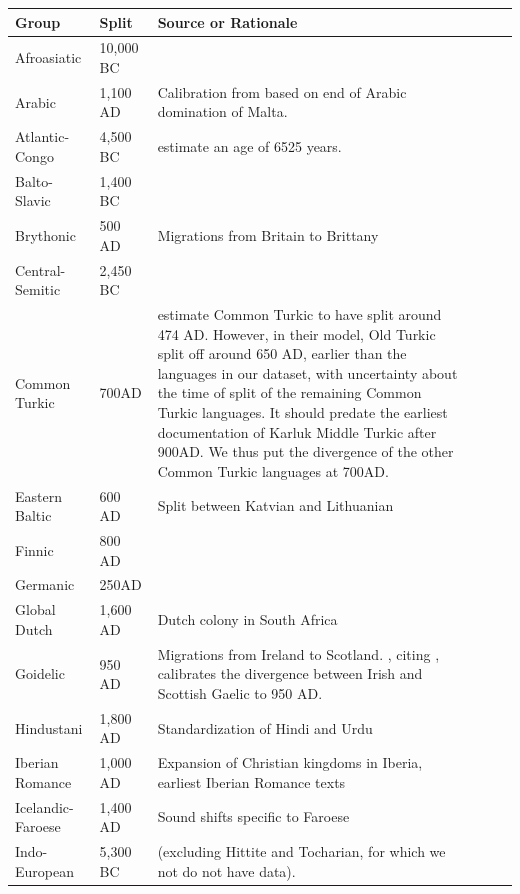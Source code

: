 \documentclass[11pt,a4paper]{article}
\begin{document}
\begin{longtable}{llp{10cm}lll}
Group & Split & Source or Rationale \\ \hline
Afroasiatic & 10,000 BC & \cite{diakonoff1998the} \\
Arabic & 1,100 AD & Calibration from \citep{holman2011automated} based on end of Arabic domination of Malta. \\
Atlantic-Congo & 4,500 BC & \citet{holman2011automated} estimate an age of 6525 years.\\
Balto-Slavic & 1,400 BC & \citep{gray2003language} \\
	Brythonic & 500 AD & Migrations from Britain to Brittany \citep{holman2011automated}\\ %
Central-Semitic & 2,450 BC & \citep{kitchen2009bayesian}   \\
Common Turkic & 700AD & \cite[p. 49]{savelyev2020bayesian} estimate Common Turkic to have split around 474 AD. However, in their model, Old Turkic split off around 650 AD, earlier than the languages in our dataset, with uncertainty about the time of split of the remaining Common Turkic languages. It should predate the earliest documentation of Karluk Middle Turkic after 900AD. We thus put the divergence of the other Common Turkic languages at 700AD. \\
Eastern Baltic & 600 AD & Split between Katvian and Lithuanian \citep[p. 209]{novotna2011glottochronology}\\
Finnic & 800 AD & \cite[Section 4.1]{maurits2020best} \\
Germanic & 250AD & \cite{gray2003language} \\
Global Dutch & 1,600 AD & Dutch colony in South Africa \\
Goidelic & 950 AD & Migrations from Ireland to Scotland. \citet{holman2011automated}, citing \citet{jackson1951gaelic}, calibrates the divergence between Irish and Scottish Gaelic to 950 AD. \\
Hindustani & 1,800 AD & Standardization of Hindi and Urdu\\
Iberian Romance & 1,000 AD & Expansion of Christian kingdoms in Iberia, earliest Iberian Romance texts \\
Icelandic-Faroese & 1,400 AD & Sound shifts specific to Faroese\\
Indo-European & 5,300 BC & \citep{gray2003language} (excluding Hittite and Tocharian, for which we not do not have data). \\

\end{longtable}
\end{document}
